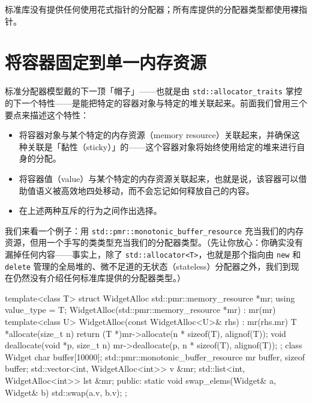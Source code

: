 标准库没有提供任何使用花式指针的分配器；所有库提供的分配器类型都使用裸指针。

\section{将容器固定到单一内存资源}

标准分配器模型戴的下一顶「帽子」——也就是由 \texttt{std::\allowbreak{}allocator\_\allowbreak{}traits} 掌控的下一个特性——是能把特定的容器对象与特定的堆关联起来。前面我们曾用三个要点来描述这个特性：

\begin{itemize}
\item 将容器对象与某个特定的内存资源（memory resource）关联起来，并确保这种关联是「黏性（sticky）」的——这个容器对象将始终使用给定的堆来进行自身的分配。
\item 将容器值（value）与某个特定的内存资源关联起来，也就是说，该容器可以借助值语义被高效地四处移动，而不会忘记如何释放自己的内容。
\item 在上述两种互斥的行为之间作出选择。
\end{itemize}

我们来看一个例子：用 \texttt{std::\allowbreak{}pmr::\allowbreak{}monotonic\_\allowbreak{}buffer\_\allowbreak{}resource} 充当我们的内存资源，但用一个手写的类类型充当我们的分配器类型。（先让你放心：你确实没有漏掉任何内容——事实上，除了 \texttt{std::\allowbreak{}allocator<\allowbreak{}T>\allowbreak{}}，也就是那个指向由 \texttt{new} 和 \texttt{delete} 管理的全局堆的、微不足道的无状态（stateless）分配器之外，我们到现在仍然没有介绍任何标准库提供的分配器类型。）

\begin{codebox}[cpp]
    template<class T>
    struct WidgetAlloc {
      std::pmr::memory_resource *mr;
      using value_type = T;
      WidgetAlloc(std::pmr::memory_resource *mr) : mr(mr) {}
      template<class U>
      WidgetAlloc(const WidgetAlloc<U>& rhs) : mr(rhs.mr) {}
      T *allocate(size_t n) {
        return (T *)mr->allocate(n * sizeof(T), alignof(T));
      }
      void deallocate(void *p, size_t n) {
        mr->deallocate(p, n * sizeof(T), alignof(T));
      }
    };
    class Widget {
      char buffer[10000];
      std::pmr::monotonic_buffer_resource mr {buffer, sizeof buffer};
      std::vector<int, WidgetAlloc<int>> v {&mr};
      std::list<int, WidgetAlloc<int>> lst {&mr};
    public:
      static void swap_elems(Widget& a, Widget& b) {
        std::swap(a.v, b.v);
      }
    };
\end{codebox}

